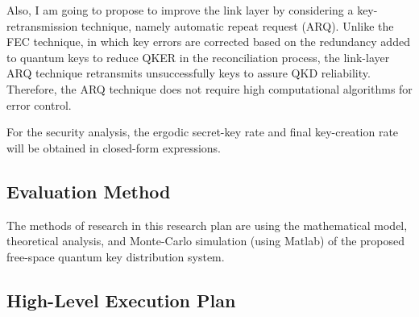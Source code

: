\documentclass[12pt,onecolumn,letterpaper]{IEEEtran}
\begin{document}
Also, I am going to propose to improve the link layer by considering a key-retransmission technique, namely automatic repeat request (ARQ). Unlike the FEC technique, in which key errors are corrected based on the redundancy added to quantum keys to reduce QKER in the reconciliation process, the link-layer ARQ technique retransmits unsuccessfully keys to assure QKD reliability. Therefore, the ARQ technique does not require high computational algorithms for error control.

For the security analysis, the ergodic secret-key rate and final key-creation rate will be obtained in closed-form expressions.

\subsection{Evaluation Method}
The methods of research in this research plan are using the mathematical model, theoretical analysis, and Monte-Carlo simulation (using Matlab) of the proposed free-space quantum key distribution system.

\subsection{High-Level Execution Plan}
\end{document}
